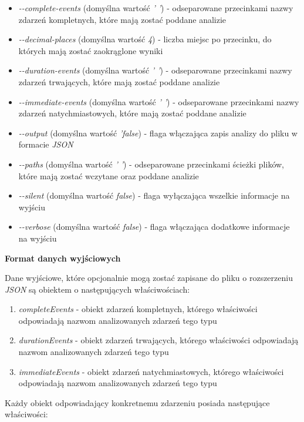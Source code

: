 \documentclass[polish, twoside, 12pt]{mwart}
\begin{document}
\begin{itemize}
  \item \emph{-{}-complete-events} (domyślna wartość \emph{' '}) - odseparowane przecinkami nazwy zdarzeń kompletnych, które mają zostać poddane analizie
  \item \emph{-{}-decimal-places} (domyślna wartość \emph{4}) - liczba miejsc po przecinku, do których mają zostać zaokrąglone wyniki
  \item \emph{-{}-duration-events} (domyślna wartość \emph{' '}) - odseparowane przecinkami nazwy zdarzeń trwających, które mają zostać poddane analizie
  \item \emph{-{}-immediate-events} (domyślna wartość \emph{' '}) - odseparowane przecinkami nazwy zdarzeń natychmiastowych, które mają zostać poddane analizie
  \item \emph{-{}-output} (domyślna wartość \emph{'false}) - flaga włączająca zapis analizy do pliku w formacie \emph{JSON}
  \item \emph{-{}-paths} (domyślna wartość \emph{' '}) - odseparowane przecinkami ścieżki plików, które mają zostać wczytane oraz poddane analizie
  \item \emph{-{}-silent} (domyślna wartość \emph{false}) - flaga wyłączająca wszelkie informacje na wyjściu
  \item \emph{-{}-verbose} (domyślna wartość \emph{false}) - flaga włączająca dodatkowe informacje na wyjściu
\end{itemize}

\textbf{Format danych wyjściowych} \newline

Dane wyjściowe, które opcjonalnie mogą zostać zapisane do pliku o rozszerzeniu \emph{JSON} są obiektem o następujących właściwościach:

\begin{enumerate}
  \item \emph{completeEvents} - obiekt zdarzeń kompletnych, którego właściwości odpowiadają nazwom analizowanych zdarzeń tego typu
  \item \emph{durationEvents} - obiekt zdarzeń trwających, którego właściwości odpowiadają nazwom analizowanych zdarzeń tego typu
  \item \emph{immediateEvents} - obiekt zdarzeń natychmiastowych, którego właściwości odpowiadają nazwom analizowanych zdarzeń tego typu
\end{enumerate}

Każdy obiekt odpowiadający konkretnemu zdarzeniu posiada następujące właściwości:
\end{document}
